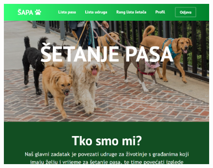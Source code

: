 				\begin{figure}[H]
					\hspace*{-0.25in}
					\includegraphics[scale=0.55]{slike/HomePage.PNG}
					\centering
				\end{figure}
				
